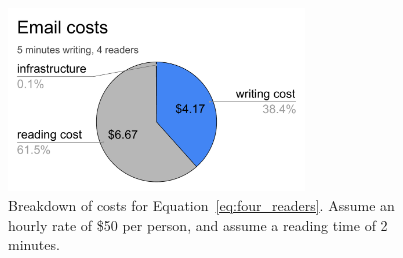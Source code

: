 \begin{figure}
    \centering
    \includegraphics[width=0.7\textwidth]{images/email_costs_5minutes_4people.pdf}
    \caption{Breakdown of costs for Equation~\ref{eq:four_readers}. Assume an hourly rate of \$50 per person, and assume a reading time of 2 minutes.}
    \label{fig:my_label}
\end{figure}



 